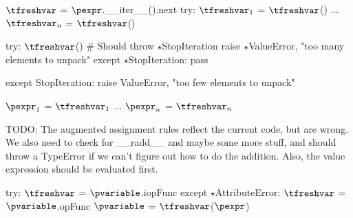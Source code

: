 \documentclass{article}
\begin{document}
\begin{mathpar}
\end{mathpar}

\begin{mathpar}
\end{mathpar}

\newsavebox{\tupleAssignmentBox}
\begin{lrbox}{\tupleAssignmentBox}
\begin{python}
$\tfreshvar$ = $\pexpr$.__iter__().next
try:
  $\tfreshvar_1$ = $\tfreshvar$()
  ...
  $\tfreshvar_n$ = $\tfreshvar$()

  try:
    $\tfreshvar$() # Should throw $\star$StopIteration
    raise $\star$ValueError, "too many elements to unpack"
  except $\star$StopIteration:
    pass

except StopIteration:
  raise ValueError, "too few elements to unpack"

$\pexpr_1$ = $\tfreshvar_1$
...
$\pexpr_n$ = $\tfreshvar_n$
\end{python}
\end{lrbox}

\begin{mathpar}
\end{mathpar}

TODO: The augmented assignment rules reflect the current code, but are wrong.
We also need to check for \_\_radd\_\_ and maybe some more stuff, and should throw a
TypeError if we can't figure out how to do the addition. Also, the value
expression should be evaluated first.
\newsavebox{\augmentedAssignmentBox}
\begin{lrbox}{\augmentedAssignmentBox}
\begin{python}
try:
  $\tfreshvar$ = $\pvariable$.iopFunc
except $\star$AttributeError:
  $\tfreshvar$ = $\pvariable$.opFunc
$\pvariable$ = $\tfreshvar$($\pexpr$)
\end{python}
\end{lrbox}

\begin{mathpar}
\end{mathpar}
\end{document}
